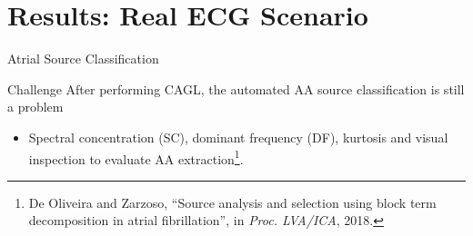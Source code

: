 \documentclass{beamer}
\begin{document}
\section{Results: Real ECG Scenario}

	\begin{frame}{Atrial Source Classification}
			
			\begin{block}{Challenge}
				After performing CAGL, the automated AA source classification is still a problem
			\end{block}
			
			\begin{itemize}
				\item Spectral concentration (SC), dominant frequency (DF), kurtosis and visual inspection to evaluate AA extraction\footnote{De Oliveira and Zarzoso, ``Source analysis and selection using block term decomposition in atrial fibrillation'', in \textit{Proc. LVA/ICA}, 2018.}.
			\end{itemize}
	\end{frame}	
\end{document}
